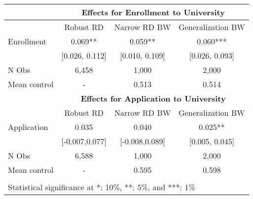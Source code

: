 \begin{tabular}{lccc}
 & \multicolumn{3}{c}{\textbf{Effects for Enrollment to University}} \\
\hline
                     & Robust RD & Narrow RD BW      & Generalization BW\\ \hline
Enrollment  & 0.069** & 0.059**              & 0.060***                    \\
                      & [0.026, 0.112] & [0.010, 0.109] & [0.026, 0.093]      \\ \addlinespace
 N Obs & 6,458 & 1,000 & 2,000 \\
 Mean control & - & 0.513 & 0.514 \\ \hline
\addlinespace
\addlinespace
\addlinespace
 & \multicolumn{3}{c}{\textbf{Effects for Application to University}} \\ \hline
                      & Robust RD & Narrow RD BW      & Generalization BW\\ \hline
Application & 0.035 & 0.040            & 0.025**                    \\
                 & [-0.007,0.077]     & [-0.008,0.089]  & [0.005, 0.045] \\ \addlinespace
                       N Obs & 6,588 & 1,000 & 2,000 \\
 Mean control & - &  0.595 & 0.598 \\ \hline
 \addlinespace
                      \multicolumn{4}{l}{\tiny{95\% CI in brackets.}} \\
                      \multicolumn{4}{l}{\tiny{Statistical significance at *: 10\%, **: 5\%, and ***: 1\%}} \\

\end{tabular}